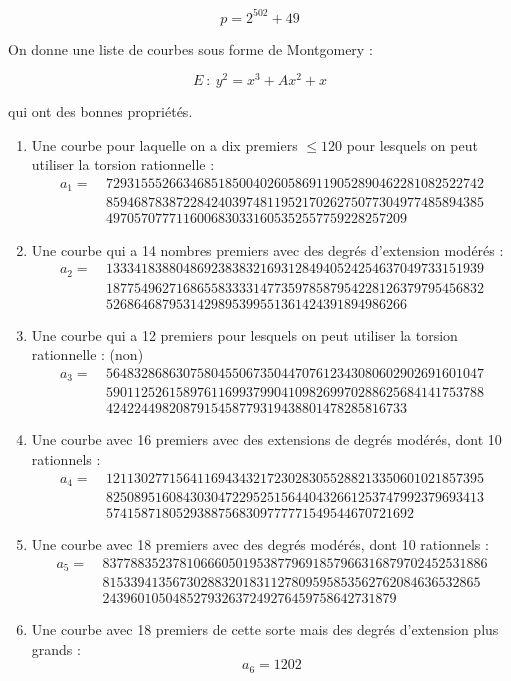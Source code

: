 \documentclass[11pt,a4paper]{article}
\theoremstyle{definition}
\begin{document}

$$p = 2^{502} + 49$$

On donne une liste de courbes sous forme de Montgomery :

$$E\ :\ y^2 = x^3 + A x^2 + x$$

qui ont des bonnes propriétés.

\begin{enumerate}
\item Une courbe pour laquelle on a dix premiers $\leq 120$ pour lesquels on peut utiliser la torsion rationnelle :
$$\begin{aligned}
a_1 =\ & 729315552663468518500402605869119052890462281082522742 \\
& 859468783872284240397481195217026275077304977485894385 \\
& 4970570777116006830331605352557759228257209
\end{aligned}$$
\item Une courbe qui a 14 nombres premiers avec des degrés d'extension modérés :
$$\begin{aligned}
a_2 =\ & 133341838804869238383216931284940524254637049733151939 \\
& 187754962716865583333147735978587954228126379795456832 \\
& 5268646879531429895399551361424391894986266
\end{aligned}$$
\item Une courbe qui a 12 premiers pour lesquels on peut utiliser la torsion rationnelle : (non)
$$\begin{aligned}
a_3 =\ & 564832868630758045506735044707612343080602902691601047 \\
& 590112526158976116993799041098269970288625684141753788 \\
& 4242244982087915458779319438801478285816733
\end{aligned}$$
\item Une courbe avec 16 premiers avec des extensions de degrés modérés, dont 10 rationnels :
$$\begin{aligned}
a_4 =\ & 121130277156411694343217230283055288213350601021857395 \\
& 825089516084303047229525156440432661253747992379693413 \\
& 57415871805293887568309777771549544670721692
\end{aligned}$$
\item Une courbe avec 18 premiers avec des degrés modérés, dont 10 rationnels :
$$\begin{aligned}
a_5 =\ & 8377883523781066605019538779691857966316879702452531886 \\
& 815339413567302883201831127809595853562762084636532865 \\
& 243960105048527932637249276459758642731879
\end{aligned}$$
\item Une courbe avec 18 premiers de cette sorte mais des degrés d'extension plus grands :
$$a_6 = 1202$$

\end{enumerate}
\end{document}
